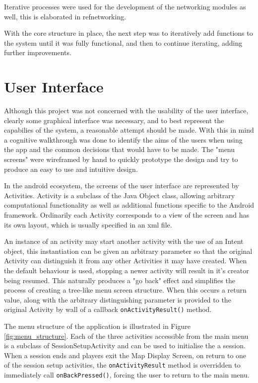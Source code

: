 Iterative processes were used for the development of the networking modules as well, this is elaborated in ref{networking}.

With the core structure in place, the next step was to iteratively add functions to the system until it was fully functional, and then to continue iterating, adding further improvements.

\section{User Interface}

Although this project was not concerned with the usability of the user interface, clearly some graphical interface was necessary, and to best represent the capabilies of the system, a reasonable attempt should be made. With this in mind a cognitive walkthrough was done to identify the aims of the users when using the app and the common decisions that would have to be made. The "menu screens" were wireframed by hand to quickly prototype the design and try to produce an easy to use and intuitive design.

In the android ecosystem, the screens of the user interface are represented by Activities. Activity is a subclass of the Java Object class, allowing arbitrary computational functionality as well as additional functions specific to the Android framework. Ordinarily each Activity corresponds to a view of the screen and has its own layout, which is usually specified in an xml file.

An instance of an activity may start another activity with the use of an Intent object, this instantiation can be given an arbitrary parameter so that the original Activity can distinguish it from any other Activities it may have created. When the default behaviour is used, stopping a newer activity will result in it's creator being resumed. This naturally produces a "go back" effect and simplifies the process of creating a tree-like menu screen structure. When this occurs a return value, along with the arbitrary distinguishing parameter is provided to the original Activity by wall of a callback {\tt onActivityResult()} method.

The menu structure of the application is illustrated in Figure \ref{fig:menu_structure}. Each of the three activities accessible from the main menu is a subclass of SessionSetupActivity and can be used to initialise the a session. When a session ends and players exit the Map Display Screen, on return to one of the session setup activities, the {\tt onActivityResult} method is overridden to immediately call {\tt onBackPressed()}, forcing the user to return to the main menu.

